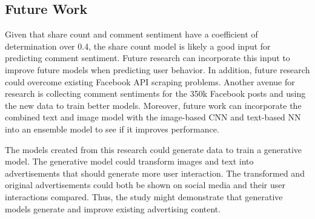\documentclass{article}
\begin{document}
\subsection{Future Work}
Given that share count and comment sentiment have a coefficient of determination over 0.4, the share count model is likely a good input for predicting comment sentiment. Future research can incorporate this input to improve future models when predicting user behavior. In addition, future research could overcome existing Facebook API scraping problems. Another avenue for research is collecting comment sentiments for the 350k Facebook posts and using the new data to train better models.  Moreover, future work can incorporate the combined text and image model with the image-based CNN and text-based NN into an ensemble model to see if it improves performance.

The models created from this research could generate data to train a generative model.  The generative model could transform images and text into advertisements that should generate more user interaction.  The transformed and original advertisements could both be shown on social media and their user interactions compared. Thus, the study might demonstrate that generative models generate and improve existing advertising content.


   
 
\end{document}
